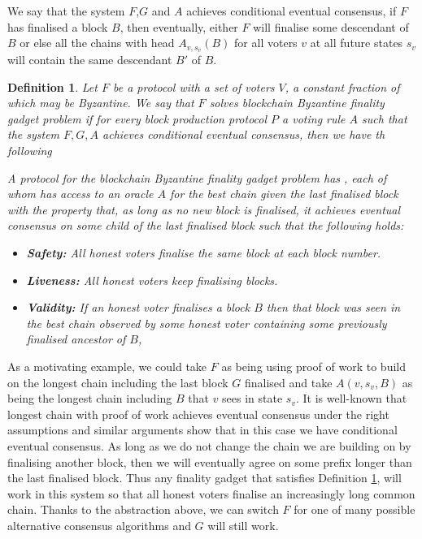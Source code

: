 \documentclass{article}
\newtheorem{definition}[theorem]{Definition}
\begin{document}
We say that the system $F$,$G$ and $A$ achieves conditional eventual consensus, if $F$ has finalised a block $B$, then eventually, either $F$ will finalise some descendant of $B$ or else all the chains with head $A_{v,s_v}(B)$ for all voters $v$ at all future states $s_v$ will contain the same descendant $B'$ of $B$.

\begin{definition} \label{def:finality-gadget} 
Let $F$ be a protocol  with a set of voters $V$, a constant fraction of which may be Byzantine.
We say that $F$ solves {\em blockchain Byzantine finality gadget problem} if for every block production protocol $P$ a voting rule $A$ such that the system $F,G,A$ achieves conditional eventual consensus, then we have th following

A protocol for the blockchain Byzantine finality gadget problem has , each of whom has access to an oracle $A$ for the best chain given the last finalised block with the property that, as long as no new block is finalised, it achieves eventual consensus on some child of the last finalised block such that the following holds:

\begin{itemize}
\item{\bf Safety:} All honest voters finalise the same block at each block number.
\item{\bf Liveness:} All honest voters keep finalising blocks.
\item{\bf Validity:} If an honest voter finalises a block $B$ then that block was seen in the best chain observed by some honest voter containing some previously finalised ancestor of $B$,
\end{itemize}

\end{definition}

As a motivating example, we could take $F$ as being using proof of work to build on the longest chain including the last block $G$ finalised and take $A(v,s_v,B)$ as being the longest chain including $B$ that $v$ sees in state $s_v$. It is well-known \cite{bitcoinpapers} that longest chain with proof of work achieves eventual consensus under the right assumptions and similar arguments show that in this case we have conditional eventual consensus.
As long as we do not change the chain we are building on by finalising another block, then we will eventually agree on some prefix longer than the last finalised block.
Thus any finality gadget that satisfies Definition \ref{def:finality-gadget}, will work in this system so that all honest voters finalise an increasingly long common chain.
Thanks to the abstraction above, we can switch $F$ for one of many possible alternative consensus algorithms and $G$ will still work.
\end{document}
